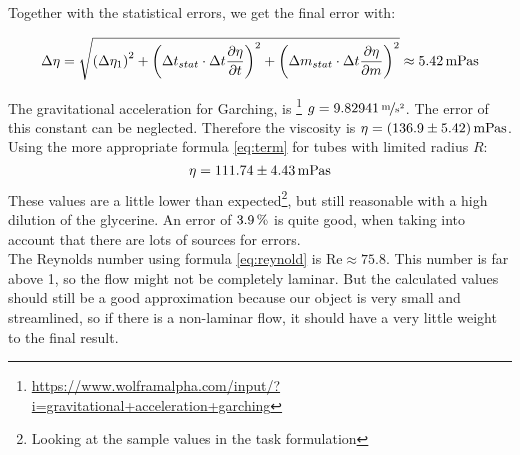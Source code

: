 Together with the statistical errors, we get the final error with:

\begin{equation}
\Delta \eta = \sqrt{\left(\Delta \eta_1\right)^2 + \left(
\Delta t_{stat} \cdot \Delta t\frac{\partial \eta}{\partial t}
\right)^2 +
\left(
\Delta m_{stat} \cdot \Delta t\frac{\partial \eta}{\partial m}
\right)^2}
\approx \unit[5.42]{mPa s}
\end{equation}

The gravitational acceleration for Garching, is%
\footnote{\url{https://www.wolframalpha.com/input/?i=gravitational+acceleration+garching}}
$g = \unitfrac[9.82941]{m}{s^2}$. The error of this constant can be neglected. Therefore the viscosity is $\eta = \unit[(136.9 \pm 5.42)]{mPa s} $.\\
Using the more appropriate formula \ref{eq:term} for tubes with limited radius $R$:
\begin{equation}
\eta = \unit[111.74 \pm 4.43]{mPa s}
\end{equation}
These values are a little lower than expected\footnote{Looking at the sample values in the task formulation}, but still reasonable with a high dilution of the glycerine. An error of $\unit[3.9]{\%}$ is quite good, when taking into account that there are lots of sources for errors.\\
The Reynolds number using formula \ref{eq:reynold} is $\text{Re} \approx 75.8$. This number is far above 1, so the flow might not be completely laminar. But the calculated values should still be a good approximation because our object is very small and streamlined, so if there is a non-laminar flow, it should have a very little weight to the final result.





